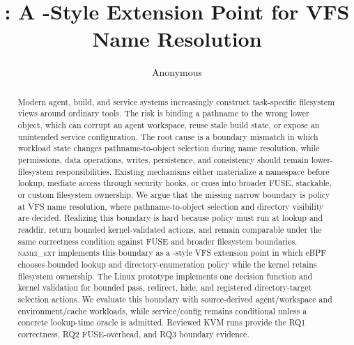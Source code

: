 \documentclass[10pt]{article}
\title{\namei: A \code{sched_ext}-Style Extension Point for VFS Name Resolution}
\author{Anonymous}
\date{}
\newcommand{\namei}{\textsc{namei\_ext}\xspace}
\newcommand{\code}[1]{\texttt{\detokenize{#1}}}
\begin{document}
\maketitle

\begin{abstract}
Modern agent, build, and service systems increasingly construct task-specific
filesystem views around ordinary tools. The risk is binding a pathname to the
wrong lower object, which can corrupt an agent workspace, reuse stale build
state, or expose an unintended service configuration. The root cause is a
boundary mismatch in which workload state changes pathname-to-object selection
during name resolution, while permissions, data operations, writes,
persistence, and consistency should remain lower-filesystem responsibilities.
Existing
mechanisms either materialize a namespace before lookup, mediate access through
security hooks, or cross into broader FUSE, stackable, or custom filesystem
ownership. We argue that the missing narrow boundary is policy at VFS name
resolution, where pathname-to-object selection and directory visibility are
decided. Realizing this boundary is hard because policy must run at lookup and
readdir, return bounded kernel-validated actions, and remain comparable under
the same correctness condition against FUSE and broader filesystem boundaries.
\namei implements this boundary as a \code{sched_ext}-style VFS extension point in which
eBPF chooses bounded lookup and directory-enumeration policy while the kernel
retains filesystem ownership. The Linux prototype implements one
\code{cgroup/namei_ext} decision function and kernel validation for bounded
pass, redirect, hide, and registered directory-target selection actions. We
evaluate this boundary with source-derived agent/workspace and environment/cache
workloads, while service/config remains conditional unless a concrete
lookup-time oracle is admitted. Reviewed KVM runs provide the RQ1 correctness,
RQ2 FUSE-overhead, and RQ3 boundary evidence.
\end{abstract}











{\small


}
\end{document}
